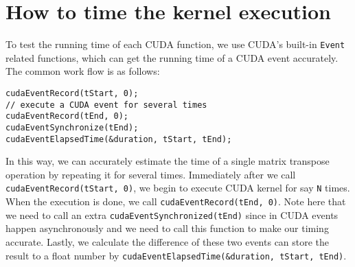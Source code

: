 \documentclass{article}
\begin{document}
\section{How to time the kernel execution}
To test the running time of each CUDA function, we use CUDA's built-in \verb|Event| related functions, which can get the running time of a CUDA event accurately. The common work flow is as follows:
\begin{lstlisting}[caption=Workflow of Time Measuring]
cudaEventRecord(tStart, 0);
// execute a CUDA event for several times
cudaEventRecord(tEnd, 0);
cudaEventSynchronize(tEnd);
cudaEventElapsedTime(&duration, tStart, tEnd);
\end{lstlisting}
In this way, we can accurately estimate the time of a single matrix transpose operation by repeating it for several times. Immediately after we call \verb|cudaEventRecord(tStart, 0)|, we begin to execute CUDA kernel for say \verb|N| times. When the execution is done, we call \verb|cudaEventRecord(tEnd, 0)|. Note here that we need to call an extra \verb|cudaEventSynchronized(tEnd)| since in CUDA events happen asynchronously and we need to call this function to make our timing accurate. Lastly, we calculate the difference of these two events can store the result to a float number by \verb|cudaEventElapsedTime(&duration, tStart, tEnd)|.
\end{document}
